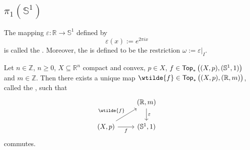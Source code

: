 \subsection*{$\pi_1(\mathbb{S}^1)$}  

\begin{definition}
	The mapping $\varepsilon : \mathbb{R} \to \mathbb{S}^1$ defined by
	\begin{equation}
		\varepsilon(x) := e^{2\pi i x}
	\end{equation}
	\noindent is called the . Moreover, the  is  defined to be the restriction $\omega := \varepsilon\vert_I$.
\end{definition}

\begin{proposition}
	\label{prop:lifting_circle}
	Let $n \in \mathbb{Z}$, $n \geq 0$, $X \subseteq \mathbb{R}^n$ compact and convex, $p \in X$, $f \in \mathsf{Top}_\ast\del[1]{(X,p),(\mathbb{S}^1,1)}$ and $m \in \mathbb{Z}$. Then there exists a unique map $\wtilde{f} \in \mathsf{Top}_\ast\del[1]{(X,p),(\mathbb{R},m)}$, called the , such that 
	\begin{equation*}
		\begin{tikzcd}
			& (\mathbb{R},m) \arrow[d,"\varepsilon"]\\
			(X,p) \ar[r,"f"']\arrow[ur,"\wtilde{f}"] & (\mathbb{S}^1,1)
		\end{tikzcd}
	\end{equation*}
	\noindent commutes. 
\end{proposition}

